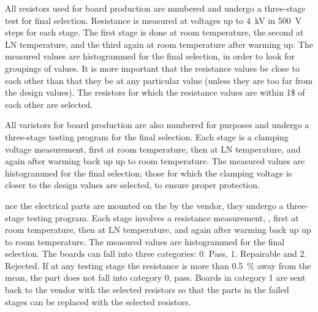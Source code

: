 All resistors used for board production are numbered and undergo a three-stage  test for final selection. Resistance is measured at voltages up to \SI{4}{kV} in \SI{500}{V} steps for each stage. The first stage is done at  room temperature, the second at LN temperature, and the third again at room temperature after warming up.  The measured values are histogrammed for the final selection, in order to look for groupings of values.   
It is more important that the resistance values be close to each other than that they be at any particular value (unless they are too far from the design values). The resistors for which the resistance values are within 1\$ of each other are selected.   

All varistors for board production are also numbered for  purposes and undergo a three-stage  testing program for the final selection. Each stage is a clamping voltage measurement, first at room temperature, then at LN temperature, and again after warming back up up to room temperature.  
The measured values are histogrammed for the final selection; those for which the clamping voltage is closer to the design values are selected, to ensure proper protection.   

nce the electrical parts are mounted on the  by the vendor, they undergo a three-stage  testing program. Each stage involves a resistance measurement, , first at room temperature, then at LN temperature, and again after warming back up up to room temperature.  The measured values are histogrammed for the final selection.
The boards can fall into three categories: 0. Pass, 1. Repairable and 2. Rejected.  
If at any testing stage the resistance is more than \SI{0.5}{\%} away from the mean, the part does not fall into category 0, pass.  Boards in category 1 are sent back to the vendor with the selected resistors so that the parts in the failed stages can be replaced with the selected resistors. %

